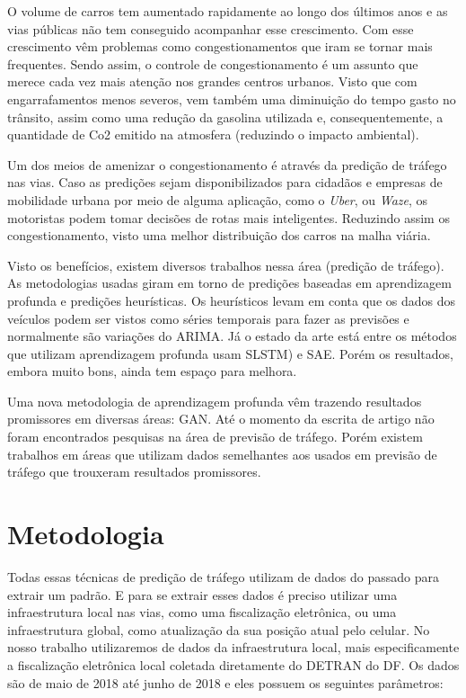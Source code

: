O volume de carros tem aumentado rapidamente ao longo dos últimos anos e as vias públicas não tem conseguido acompanhar esse crescimento. Com esse crescimento vêm problemas como congestionamentos que iram se tornar mais frequentes. Sendo assim, o controle de congestionamento é um assunto que merece cada vez mais atenção nos grandes centros urbanos. Visto que com engarrafamentos menos severos, vem também uma diminuição do tempo gasto no trânsito, assim como uma redução da gasolina utilizada e, consequentemente, a quantidade de Co2 emitido na atmosfera (reduzindo o impacto ambiental).

Um dos meios de amenizar o congestionamento é através da predição de tráfego nas vias. Caso as predições sejam disponibilizados para cidadãos e empresas de mobilidade urbana por meio de alguma aplicação, como o \textit{Uber}, ou \textit{Waze}, os motoristas podem tomar decisões de rotas mais inteligentes. Reduzindo assim os congestionamento, visto uma melhor distribuição dos carros na malha viária.

Visto os benefícios, existem diversos trabalhos nessa área (predição de tráfego). As metodologias usadas giram em torno de predições baseadas em aprendizagem profunda \cite{Xiaolei_2015} \cite{Zainab_2018} \cite{he2013improving} \cite{wang_2018} \cite{lv_6894591} e predições heurísticas. Os heurísticos levam em conta que os dados dos veículos podem ser vistos como séries temporais para fazer as previsões e normalmente são variações do \acrfull{ARIMA}. Já o estado da arte está entre os métodos que utilizam aprendizagem profunda usam \acrfull{SLSTM}) e \acrfull{SAE}. Porém os resultados, embora muito bons, ainda tem espaço para melhora.

Uma nova metodologia de aprendizagem profunda vêm trazendo resultados promissores em diversas áreas: \acrfull{GAN}. Até o momento da escrita de artigo não foram encontrados pesquisas na área de previsão de tráfego. Porém existem trabalhos em áreas que utilizam dados semelhantes aos usados em previsão de tráfego que trouxeram resultados promissores. 

\section{Metodologia}
Todas essas técnicas de predição de tráfego utilizam de dados do passado para extrair um padrão. E para se extrair esses dados é preciso utilizar uma infraestrutura local nas vias, como uma fiscalização eletrônica, ou uma infraestrutura global, como atualização da sua posição atual pelo celular. No nosso trabalho utilizaremos de dados da infraestrutura local, mais especificamente a fiscalização eletrônica local coletada diretamente do \acrfull{DETRAN} do \acrfull{DF}. Os dados são de maio de 2018 até junho de 2018 e eles possuem os seguintes parâmetros:


